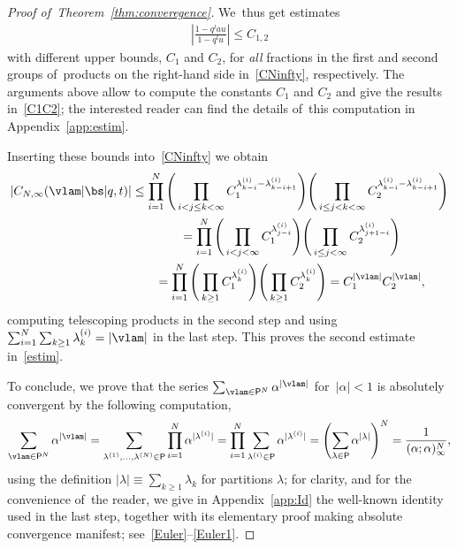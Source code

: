 \begin{proof}[Proof of~Theorem~\ref{thm:converegence}]
We~thus get estimates
\begin{gather*}
\left|\frac{1-q^{l}au}{1-q^l u}\right| \leq C_{1,2}
\end{gather*}
with different upper bounds, $C_1$ and $C_2$, for {\em all} fractions in the first and second groups of~pro\-ducts on the right-hand side in~\eqref{CNinfty}, respectively.
The arguments above allow to compute the constants $C_1$ and $C_2$ and give the results in~\eqref{C1C2}; the interested reader can find the details of~this computation in Appendix~\ref{app:estim}.

Inserting these bounds into~\eqref{CNinfty} we obtain
\begin{gather}
|C_{N,\infty}(\vlam|\bs|q,t)| \leq
\prod_{i=1}^N \Bigg( \prod_{i< j\leq k< \infty} C_1^{\lambda^{(i)}_{k-i}-\lambda^{(i)}_{k-i+1}}\Bigg)\Bigg( \prod_{i\leq j< k< \infty} C_2^{\lambda^{(i)}_{k-i}-\lambda^{(i)}_{k-i+1}}\Bigg) \nonumber
\\ \hphantom{|C_{N,\infty}(\vlam|\bs|q,t)|}
{}= \prod_{i=1}^N \Bigg( \prod_{i< j< \infty} C_1^{\lambda^{(i)}_{j-i}}\Bigg)\Bigg( \prod_{i\leq j< \infty} C_2^{\lambda^{(i)}_{j+1-i}}\Bigg)\nonumber
\\ \hphantom{|C_{N,\infty}(\vlam|\bs|q,t)|}
{}= \prod_{i=1}^N \Bigg( \prod_{k\geq 1} C_1^{\lambda^{(i)}_{k}}\Bigg) \Bigg( \prod_{k\geq 1} C_2^{\lambda^{(i)}_{k}}\Bigg) = C_1^{|\vlam|}C_2^{|\vlam|},
\label{Cbound}
\end{gather}
computing telescoping products in the second step and using $\sum_{i=1}^N\sum_{k\geq 1}\lambda^{(i)}_k=|\vlam|$ in the last step.
This proves the second estimate in~\eqref{estim}.

To conclude, we prove that the series $\sum_{\vlam\in\mathsf{P}^N} \alpha^{|\vlam|}$ for~$|\alpha|<1$ is absolutely convergent by the following computation,
\begin{gather*}
\sum_{\vlam\in\mathsf{P}^N} \alpha^{|\vlam|} = \sum_{\lambda^{(1)},\dots,\lambda^{(N)}\in\mathsf{P}} \prod_{i=1}^N \alpha^{|\lambda^{(i)}|} =
 \prod_{i=1}^N \sum_{\lambda^{(i)}\in\mathsf{P}} \alpha^{|\lambda^{(i)}|} =\left( \sum_{\lambda\in\mathsf{P}} \alpha^{|\lambda|}\right)^N = \frac1{(\alpha;\alpha)_\infty^N},
\end{gather*}
using the definition $|\lambda|\equiv \sum_{k\geq 1}\lambda_k$ for partitions $\lambda$; for clarity, and for the convenience of~the reader, we give in Appendix~\ref{app:Id} the well-known identity used in the last step, together with its elementary proof making absolute convergence manifest; see~\eqref{Euler}--\eqref{Euler1}.
\end{proof}
